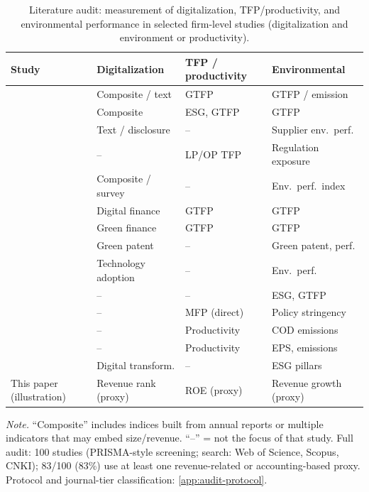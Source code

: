 \begin{table}[htbp]
  \centering
  \caption{Literature audit: measurement of digitalization, TFP/productivity, and environmental performance in selected firm-level studies (digitalization and environment or productivity).}
  \label{tab:literature-audit}
  \small
  \begin{tabularx}{\textwidth}{@{}>{\raggedright\arraybackslash}p{4cm}>{\raggedright\arraybackslash}X>{\raggedright\arraybackslash}X>{\raggedright\arraybackslash}p{2.9cm}@{}}
    \toprule
    Study & Digitalization & TFP / productivity & Environmental \\
    \midrule
    \citet{WANG2026128596} & Composite / text & GTFP & GTFP / emission \\
    \citet{XUE2025108398} & Composite & ESG, GTFP & GTFP \\
    \citet{ZHANG2026116098} & Text / disclosure & -- & Supplier env.\ perf. \\
    \citet{LU2026105596} & -- & LP/OP TFP & Regulation exposure \\
    \citet{NAZIR2026100029} & Composite / survey & -- & Env.\ perf.\ index \\
    \citet{HUANG2025108536} & Digital finance & GTFP & GTFP \\
    \citet{SUN2025108205} & Green finance & GTFP & GTFP \\
    \citet{YAO2026105060} & Green patent & -- & Green patent, perf. \\
    \citet{KE2026104981} & Technology adoption & -- & Env.\ perf. \\
    \citet{GONG2026102241} & -- & -- & ESG, GTFP \\
    \citet{ALBRIZIO2017209} & -- & MFP (direct) & Policy stringency \\
    \citet{WANG201854} & -- & Productivity & COD emissions \\
    \citet{BENATTI2024102995} & -- & Productivity & EPS, emissions \\
    \citet{YANG2026101708} & Digital transform. & -- & ESG pillars \\
    This paper (illustration) & Revenue rank (proxy) & ROE (proxy) & Revenue growth (proxy) \\
    \bottomrule
  \end{tabularx}
  \medskip
  \footnotesize\textit{Note.} ``Composite'' includes indices built from annual reports or multiple indicators that may embed size/revenue. ``--'' = not the focus of that study. Full audit: 100 studies (PRISMA-style screening; search: Web of Science, Scopus, CNKI); 83/100 (83\%) use at least one revenue-related or accounting-based proxy. Protocol and journal-tier classification: \ref{app:audit-protocol}.
\end{table}
